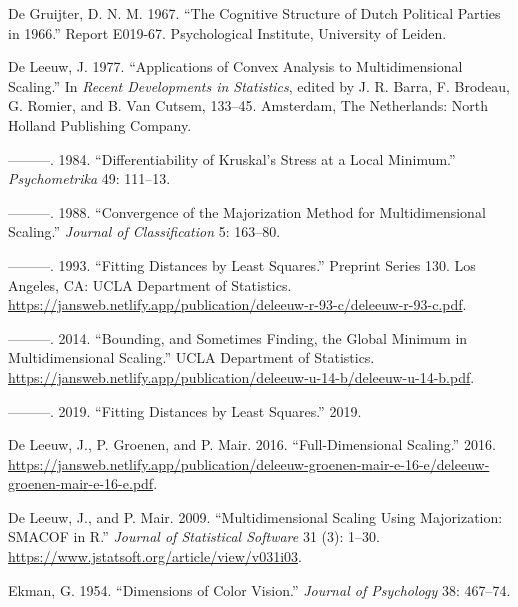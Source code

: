 \documentclass[
  12pt,
]{article}
\newlength{\cslhangindent}
\newenvironment{CSLReferences}[2] %
 {\begin{list}{}{%
  \setlength{\itemindent}{0pt}
  \setlength{\leftmargin}{0pt}
  \setlength{\parsep}{0pt}
  \ifodd #1
   \setlength{\leftmargin}{\cslhangindent}
   \setlength{\itemindent}{-1\cslhangindent}
  \fi
  \setlength{\itemsep}{#2\baselineskip}}}
 {\end{list}}
\begin{document}
\label{refs}
\begin{CSLReferences}{1}{0}
De Gruijter, D. N. M. 1967. {``{The Cognitive Structure of Dutch Political Parties in 1966}.''} Report E019-67. Psychological Institute, University of Leiden.

De Leeuw, J. 1977. {``Applications of Convex Analysis to Multidimensional Scaling.''} In \emph{Recent Developments in Statistics}, edited by J. R. Barra, F. Brodeau, G. Romier, and B. Van Cutsem, 133--45. Amsterdam, The Netherlands: North Holland Publishing Company.

---------. 1984. {``{Differentiability of Kruskal's Stress at a Local Minimum}.''} \emph{Psychometrika} 49: 111--13.

---------. 1988. {``Convergence of the Majorization Method for Multidimensional Scaling.''} \emph{Journal of Classification} 5: 163--80.

---------. 1993. {``Fitting Distances by Least Squares.''} Preprint Series 130. Los Angeles, CA: UCLA Department of Statistics. \url{https://jansweb.netlify.app/publication/deleeuw-r-93-c/deleeuw-r-93-c.pdf}.

---------. 2014. {``{Bounding, and Sometimes Finding, the Global Minimum in Multidimensional Scaling}.''} UCLA Department of Statistics. \url{https://jansweb.netlify.app/publication/deleeuw-u-14-b/deleeuw-u-14-b.pdf}.

---------. 2019. {``{Fitting Distances by Least Squares}.''} 2019.

De Leeuw, J., P. Groenen, and P. Mair. 2016. {``Full-Dimensional Scaling.''} 2016. \url{https://jansweb.netlify.app/publication/deleeuw-groenen-mair-e-16-e/deleeuw-groenen-mair-e-16-e.pdf}.

De Leeuw, J., and P. Mair. 2009. {``{Multidimensional Scaling Using Majorization: SMACOF in R}.''} \emph{Journal of Statistical Software} 31 (3): 1--30. \url{https://www.jstatsoft.org/article/view/v031i03}.

Ekman, G. 1954. {``{Dimensions of Color Vision}.''} \emph{Journal of Psychology} 38: 467--74.


\end{CSLReferences}
\end{document}
